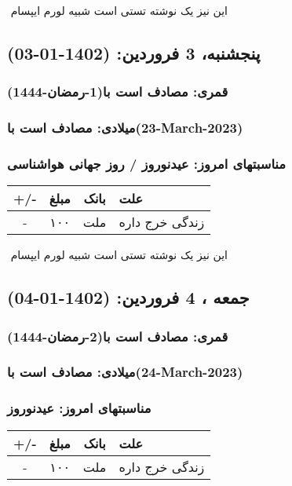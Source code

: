 \documentclass{article}
\newcommand{\rnote}[1]{\marginpar{\textcolor{color}{\StrSubstitute{\##1}{ }{\_}}}}
\newcommand{\myRow}[4]{
    #1 & #2 & #3 & #4 \\ \hline
}
\begin{document}
‌
\rnote{تست}
این نیز یک نوشته تستی است شبیه لورم ایپسام




\newpage
{}
\textcolor{color}{
\section{ پنجشنبه، 3 فروردین: (1402-01-03) }
\subsubsection*{قمری: مصادف است با(1-رمضان-1444)} 
\subsubsection*{میلادی: مصادف است با(23-March-2023)}
\subsubsection*{مناسبتهای امروز: عیدنوروز / روز جهانی هواشناسی}
}


\begin{tabular}{ | c | c | c | p{5cm} |}
    \hline
    \myRow{ +/- }{مبلغ}{بانک}{علت}
    \myRow{-}{۱۰۰}{ملت}{زندگی خرج داره}
\end{tabular}
\newline
\newline

‌
\rnote{تست}
این نیز یک نوشته تستی است شبیه لورم ایپسام




\newpage
{}
\textcolor{color}{
\section{ جمعه ، 4 فروردین: (1402-01-04) }
\subsubsection*{قمری: مصادف است با(2-رمضان-1444)} 
\subsubsection*{میلادی: مصادف است با(24-March-2023)}
\subsubsection*{مناسبتهای امروز: عیدنوروز}
}


\begin{tabular}{ | c | c | c | p{5cm} |}
    \hline
    \myRow{ +/- }{مبلغ}{بانک}{علت}
    \myRow{-}{۱۰۰}{ملت}{زندگی خرج داره}
\end{tabular}
\newline
\newline
\end{document}
